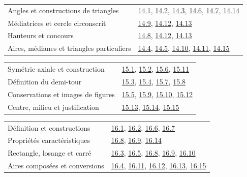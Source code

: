 \begin{tabularx}{\linewidth}{@{}Yl@{}}\toprule
Angles et constructions de triangles & \hyperref[exo-14-1]{14.1}, \hyperref[exo-14-2]{14.2}, \hyperref[exo-14-3]{14.3}, \hyperref[exo-14-6]{14.6}, \hyperref[exo-14-7]{14.7}, \hyperref[exo-14-14]{14.14}\\[2mm]
Médiatrices et cercle circonscrit & \hyperref[exo-14-9]{14.9}, \hyperref[exo-14-12]{14.12}, \hyperref[exo-14-13]{14.13}\\[2mm]
Hauteurs et concours & \hyperref[exo-14-8]{14.8}, \hyperref[exo-14-12]{14.12}, \hyperref[exo-14-13]{14.13}\\[2mm]
Aires, médianes et triangles particuliers & \hyperref[exo-14-4]{14.4}, \hyperref[exo-14-5]{14.5}, \hyperref[exo-14-10]{14.10}, \hyperref[exo-14-11]{14.11}, \hyperref[exo-14-15]{14.15}\\[2mm]
\bottomrule\end{tabularx}\par\vspace{4mm}
\begin{tabularx}{\linewidth}{@{}Yl@{}}\toprule
Symétrie axiale et construction & \hyperref[exo-15-1]{15.1}, \hyperref[exo-15-2]{15.2}, \hyperref[exo-15-6]{15.6}, \hyperref[exo-15-11]{15.11}\\[2mm]
Définition du demi-tour & \hyperref[exo-15-3]{15.3}, \hyperref[exo-15-4]{15.4}, \hyperref[exo-15-7]{15.7}, \hyperref[exo-15-8]{15.8}\\[2mm]
Conservations et images de figures & \hyperref[exo-15-5]{15.5}, \hyperref[exo-15-9]{15.9}, \hyperref[exo-15-10]{15.10}, \hyperref[exo-15-12]{15.12}\\[2mm]
Centre, milieu et justification & \hyperref[exo-15-13]{15.13}, \hyperref[exo-15-14]{15.14}, \hyperref[exo-15-15]{15.15}\\[2mm]
\bottomrule\end{tabularx}\par\vspace{4mm}
\clearpage
{}\fontsize{10}{13}\selectfont
{}\begin{tabularx}{\linewidth}{@{}Yl@{}}\toprule
Définition et constructions & \hyperref[exo-16-1]{16.1}, \hyperref[exo-16-2]{16.2}, \hyperref[exo-16-6]{16.6}, \hyperref[exo-16-7]{16.7}\\[2mm]
Propriétés caractéristiques & \hyperref[exo-16-8]{16.8}, \hyperref[exo-16-9]{16.9}, \hyperref[exo-16-14]{16.14}\\[2mm]
Rectangle, losange et carré & \hyperref[exo-16-3]{16.3}, \hyperref[exo-16-5]{16.5}, \hyperref[exo-16-8]{16.8}, \hyperref[exo-16-9]{16.9}, \hyperref[exo-16-10]{16.10}\\[2mm]
Aires composées et conversions & \hyperref[exo-16-4]{16.4}, \hyperref[exo-16-11]{16.11}, \hyperref[exo-16-12]{16.12}, \hyperref[exo-16-13]{16.13}, \hyperref[exo-16-15]{16.15}\\[2mm]
\bottomrule\end{tabularx}\par\vspace{4mm}
